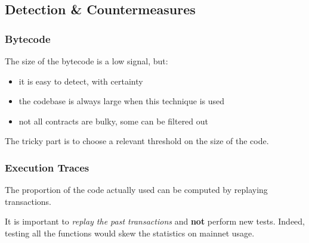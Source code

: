 \subsection{Detection \& Countermeasures}

\subsubsection{Bytecode}

The size of the bytecode is a low signal, but:

\begin{itemize}
\item{it is easy to detect, with certainty}
\item{the codebase is always large when this technique is used}
\item{not all contracts are bulky, some can be filtered out}
\end{itemize}

The tricky part is to choose a relevant threshold on the size of the code.

\subsubsection{Execution Traces}

The proportion of the code actually used can be computed by replaying transactions.

It is important to \emph{replay the past transactions} and \textbf{not} perform new tests.
Indeed, testing all the functions would skew the statistics on mainnet usage.

